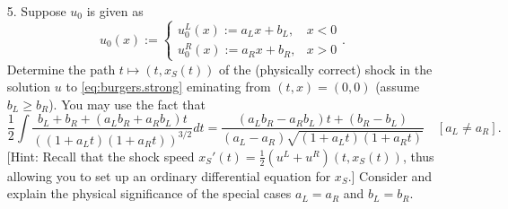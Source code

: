 \documentclass{article}
\begin{document}
\begin{itemize}
\textbf{Solution}

Let $u$ denote the solution to \eqref{eq:burgers.strong} with initial condition $u_0$, and let $v$ denote the solution to \eqref{eq:burgers.strong} with initial condition $v_0(x) := a u_0(x) + b$. Using \eqref{eq:burgers.implicit}, we wish to solve
\begin{equation*}
v = v_0 \left( x - tv \right) = a u_0 \left( x - tv \right) + b \quad \Leftrightarrow \quad \frac{1}{a} \left( v - b \right) = u_0 \left( (x - tb) - (at) \frac{1}{a} \left( v - b \right) \right),
\end{equation*}
which suggests that
\begin{equation*}
\frac{1}{a} \left( v(t,x) - b \right) = u \left( at, x - tb \right) \quad \Leftrightarrow \quad v(t,x) = a u \left( at, x - tb \right) + b.
\end{equation*}
Indeed, one can quickly verify that this does, in fact, solve \eqref{eq:burgers.strong} with initial condition $v_0$. In other words,
\begin{equation*}
F \left[ x \mapsto a u_0(x) + b \right](t,x) = a F \left[ u_0 \right] \left( at, x - tb \right) + b.
\end{equation*}

\item[5.] Suppose $u_0$ is given as
\begin{equation*}
u_0(x) := \begin{cases} u^L_0(x) := a_L x + b_L, & x < 0 \\ u^R_0(x) := a_R x + b_R, & x > 0 \end{cases}.
\end{equation*}
Determine the path $t \mapsto \left( t, x_S(t) \right)$ of the (physically correct) shock in the solution $u$ to \eqref{eq:burgers.strong} eminating from $(t,x) = (0,0)$ (assume $b_L \geq b_R$). You may use the fact that
\begin{equation*}
\frac{1}{2} \int \frac{b_L + b_R + \left( a_L b_R + a_R b_L \right) t}{\left( \left( 1 + a_L t \right) \left( 1 + a_R t \right) \right)^{3/2}} dt = \frac{\left( a_L b_R - a_R b_L \right) t + \left( b_R - b_L \right)}{\left( a_L - a_R \right) \sqrt{\left( 1 + a_L t \right) \left( 1 + a_R t \right)}} \quad \left[ a_L \neq a_R \right].
\end{equation*}
[Hint: Recall that the shock speed $x_S'(t) = \frac{1}{2} \left( u^L + u^R \right) \left( t, x_S(t) \right)$, thus allowing you to set up an ordinary differential equation for $x_S$.] Consider and explain the physical significance of the special cases $a_L = a_R$ and $b_L = b_R$.


\end{itemize}
\end{document}
